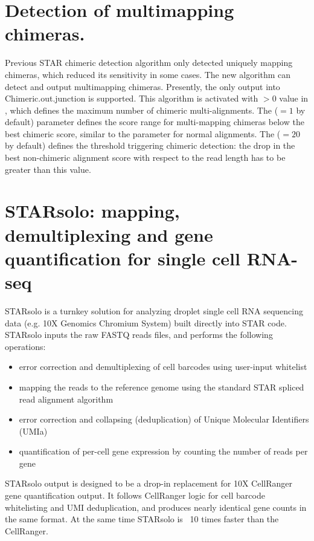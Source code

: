 \documentclass[12pt]{article}
\begin{document}
\section{Detection of multimapping chimeras.}
Previous STAR chimeric detection algorithm only detected uniquely mapping chimeras, which reduced its sensitivity in some cases.
The new algorithm can detect and output multimapping chimeras. Presently, the only output into Chimeric.out.junction is supported.
This algorithm is activated with $>0$ value in , which defines the maximum number of chimeric multi-alignments.
The  ($=1$ by default) parameter defines the score range for multi-mapping chimeras below the best chimeric score, similar to the  parameter for normal alignments.
The  ($=20$ by default) defines the threshold triggering chimeric detection: the drop in the best non-chimeric alignment score with respect to the read length has to be greater than this value.

\section{STARsolo: mapping, demultiplexing and gene quantification for single cell RNA-seq}

STARsolo is a turnkey solution for analyzing droplet single cell RNA sequencing data (e.g. 10X Genomics Chromium System) built directly into STAR code.
STARsolo inputs the raw FASTQ reads files, and performs the following operations:
\begin{itemize}
	\itemsep -0.5em
	\item 
	error correction and demultiplexing of cell barcodes using user-input whitelist
	\item 
	mapping the reads to the reference genome using the standard STAR spliced read alignment algorithm
	\item
	error correction and collapsing (deduplication) of Unique Molecular Identifiers (UMIa)
	\item
	quantification of per-cell gene expression by counting the number of reads per gene
\end{itemize}
STARsolo output is designed to be a drop-in replacement for 10X CellRanger gene quantification output.
It follows CellRanger logic for cell barcode whitelisting and UMI deduplication, and produces nearly identical gene counts in the same format. At the same time STARsolo is ~10 times faster than the CellRanger.
\end{document}
